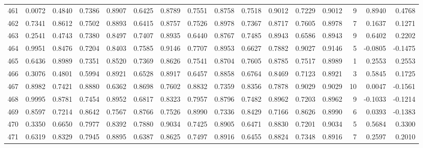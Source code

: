 \begin{tabular}{lrrrrrrrrrrrrrrr}
461 &      0.0072 &  0.4840 &  0.7386 &  0.8907 &  0.6425 &  0.8789 &  0.7551 &  0.8758 &  0.7518 &  0.9012 &   0.7229 &     0.9012 &      9 &                    0.8940 &                     0.4768 \\
462 &      0.7341 &  0.8612 &  0.7502 &  0.8893 &  0.6415 &  0.8757 &  0.7526 &  0.8978 &  0.7367 &  0.8717 &   0.7605 &     0.8978 &      7 &                    0.1637 &                     0.1271 \\
463 &      0.2541 &  0.4743 &  0.7380 &  0.8497 &  0.7407 &  0.8935 &  0.6440 &  0.8767 &  0.7485 &  0.8943 &   0.6586 &     0.8943 &      9 &                    0.6402 &                     0.2202 \\
464 &      0.9951 &  0.8476 &  0.7204 &  0.8403 &  0.7585 &  0.9146 &  0.7707 &  0.8953 &  0.6627 &  0.7882 &   0.9027 &     0.9146 &      5 &                   -0.0805 &                    -0.1475 \\
465 &      0.6436 &  0.8989 &  0.7351 &  0.8520 &  0.7369 &  0.8626 &  0.7541 &  0.8704 &  0.7605 &  0.8785 &   0.7517 &     0.8989 &      1 &                    0.2553 &                     0.2553 \\
466 &      0.3076 &  0.4801 &  0.5994 &  0.8921 &  0.6528 &  0.8917 &  0.6457 &  0.8858 &  0.6764 &  0.8469 &   0.7123 &     0.8921 &      3 &                    0.5845 &                     0.1725 \\
467 &      0.8982 &  0.7421 &  0.8880 &  0.6362 &  0.8698 &  0.7602 &  0.8832 &  0.7359 &  0.8356 &  0.7878 &   0.9029 &     0.9029 &     10 &                    0.0047 &                    -0.1561 \\
468 &      0.9995 &  0.8781 &  0.7454 &  0.8952 &  0.6817 &  0.8323 &  0.7957 &  0.8796 &  0.7482 &  0.8962 &   0.7203 &     0.8962 &      9 &                   -0.1033 &                    -0.1214 \\
469 &      0.8597 &  0.7214 &  0.8642 &  0.7567 &  0.8766 &  0.7526 &  0.8990 &  0.7336 &  0.8429 &  0.7166 &   0.8626 &     0.8990 &      6 &                    0.0393 &                    -0.1383 \\
470 &      0.3350 &  0.6650 &  0.7977 &  0.8392 &  0.7880 &  0.9034 &  0.7425 &  0.8905 &  0.6471 &  0.8830 &   0.7201 &     0.9034 &      5 &                    0.5684 &                     0.3300 \\
471 &      0.6319 &  0.8329 &  0.7945 &  0.8895 &  0.6387 &  0.8625 &  0.7497 &  0.8916 &  0.6455 &  0.8824 &   0.7348 &     0.8916 &      7 &                    0.2597 &                     0.2010 \\

\end{tabular}
